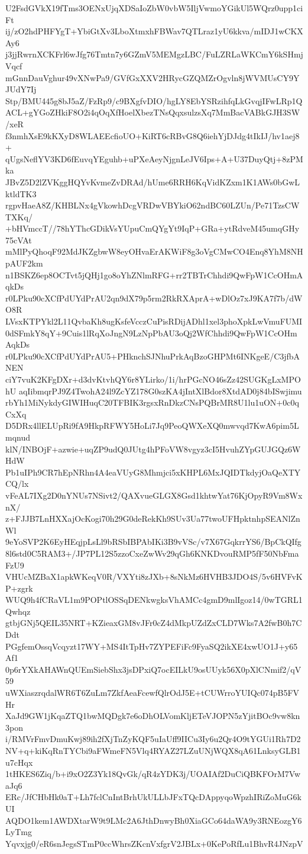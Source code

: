 U2FsdGVkX19fTms3OENxUjqXDSaIoZbW0vbW5IljVwmoYGikUl5WQrz0upp1ciFt
ij/zO2hdPHFYgT+YbiGtXv3LboXtmxhFBWav7QTLraz1yU6kkva/mIDJ1wCKXAy6
j3jjRwrnXCKFrl6wJfg76Tmtn7y6GZmV5MEMgzLBC/FuLZRLaWKCmY6kSHmjVqcf
mGnnDauVghur49vXNwPa9/GVfGxXXV2HRycGZQMZrOgvln8jWVMUsCY9YJUdY7Ij
Stp/BMU445g8bJ5aZ/FzRp9/c9BXgfvDIO/hgLY8EbYSRzihfqLkGvqjIFwLRp1Q
ACL+gYGoZHkiF8O2i4qOqXfHoelXbezTNsQqxsulzsXq7MmBacVABkGJH3SW/xeR
f3nmhXsE9kKXyD8WLAEEcfioUO+KiRT6cRBvG8Q6iehYjDJdg4tIkIJ/hv1aej8+
qUgsNeflYV3KD6fEuvqYEguhb+uPXeAeyNjgnLeJV6Ips+A+U37DuyQtj+8zPMka
JBvZ5D2lZVKggHQYvKvmeZvDRAd/hUme6RRH6KqVidKZxm1K1AWs0bGwLktldTK3
rgpvHaeA8Z/KHBLNx4gVkowhDcgVRDwVBYkiO62ndBC60LZUn/Pe71TzsCWTXKq/
+bHVmccT//78hYThcGDikVsYUpuCmQYgYt9IqP+GRa+ytRdveM45umqGHy75cVAt
mMlPyQhoqF92MdJKZgbwW8eyOHvaErAKWiF8g3oVgCMwCO4Enq8YhM8NHpAUF2km
n1BSKZ6ep8OCTvt5jQHj1go8oYhZNlmRFG+rr2TBTrChhdi9QwFpW1CcOHmAqkDs
r0LPku90cXCfPdUYdPrAU2qn9dX79p5rm2RkRXAprA+wDlOz7xJ9KA7f7b/dWO8R
LVsxKTPYkl2L11QvbaKh8ugKsfeVcczCuPisRDijADhl1xel3phoXpkLwVmuFUMI
0dSFmkY8qY+9Cuis1lRqXoJngN9LzNpPbAU3oQj2WfChhdi9QwFpW1CcOHmAqkDs
r0LPku90cXCfPdUYdPrAU5+PHknchSJNhuPrkAqBzoGHPMt6INKgeE/C3jfbANEN
ciY7vuK2KFgDXr+d3dvKtvhQY6r8YLirko/1i/hrPGcNO46sZz42SUGKgLxMPOhU
aqIibmqrPJ9Z4TwohA24l9ZcYZ178G0szKA4jIntXlBdor8XtdAD0j84bISwjimu
rbYh1MiNykdyGIWIHuqC20TFBIK3rgsxRnDkzCNsPQBrMR8U1lu1uON+0c0qCxXq
D5DRx4llELUpRi9fA9HkpRFWY5HoLi7Jq9PeoQWXeXQ0mwvqd7KwA6pim5Lmqnud
klN/INBOjF+azwie+uqZP9udQ0JUtg4hPFoVW8vgyz3cI5HvuhZYpGUJGQz6WHdW
Pb1uIPh9CR7hEpNRhn4A4eaVUyG8Mhmjci5xKHPL6MxJQIDTkdyjOaQeXTYCQ/lx
vFeAL7IXg2D0nYNUs7NSivt2/QAXvueGLGX8Gsd1khtwYat76KjOpyR9Vm8WxnX/
z+FJJB7LnHXXajOcKogi70h29G0deRekKh9SUv3Ua77twoUFHpktnhpSEANlZnWl
9eYoSVP2K6EyHEqjpLsLl9bRSbIBPAbIKi3B9vVSc/v7X67GqkrrYS6/BpCkQIfg
8l6std0C5RAM3+/JP7PL12S5zzoCxeZwWv29qGh6KNKDvouRMP5fF50NbFmaFzU9
VHUcMZBaX1apkWKeqV0R/VXYti8zJXb+8sNkMz6HVHB3JDO4S/5v6HVFvKP+zgrk
WUQ9h4fCRaVL1m9POPtlOSSqDENkwgksVhAMCc4gmD9mlIgoz14/0wTGRL1Qwhqz
gtbjGNj5QEIL35NRT+KZieaxGM8vJFr0cZ4dMkpUZdZxCLD7Wks7A2fwB0h7CDdt
PGgfemOssqVcqyzt17WY+MS4ItTpHv7ZYPEFiFc9FyaSQ2ikXE4xwUO1J+y65Af1
0p6rYXkAHAWnQUEmSiebShx3jsDPxiQ7ocEILkU9osUUyk56X0pXlCNmif2/qV59
uWXiaszrqdalWR6T6ZuLm7ZkfAeaFcewfQlrOdJ5E+tCUWrroYUIQc074pB5FVHr
XaJd9GW1jKqaZTQ1bwMQDgk7e6oDhOLVomKljETeVJOPN5zYjitBOc9vw8kn3pon
i/RMVrFmvDmuKwj89ih2fXjTnZyKQF5uIaUff9IICu3Iy6u2Qr4O9tYGUi1Rh7D2
NV+q+kiKqRnTYCbi9aFWmeFN5Vlq4RYAZ27LZuUNjWQX8qA61LnksyGLB1u7cHqx
1tHKES6Ziq/b+i9xO2Z3Yk18QvGk/qR4zYDK3j/UOAIAf2DuCiQBKFOrM7VwaJq6
ERc/JfCHbHk0aT+Lh7fclCnIntBrhUkULLbJFxTQcDAppyqoWpzhIRiZoMuG6kUI
AQDO1kem1AWDXtarW9t9LMc2A6JthDnwyBh0XiaGCo64daWA9y3RNEozgY6LyTmg
Yqvxjg0/eR6snJegsSTmP0ccWhrsZKcnVxfgrV2JBLx+0KePoRfLu1BhvR4JNzpV
